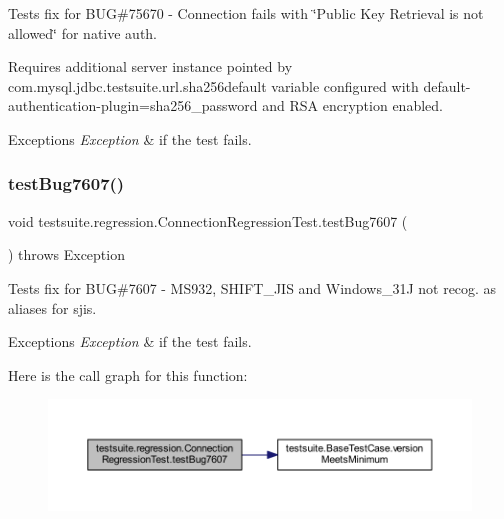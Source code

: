Tests fix for B\+UG\#75670 -\/ Connection fails with \char`\"{}\+Public Key Retrieval is not allowed\char`\"{} for native auth.

Requires additional server instance pointed by com.\+mysql.\+jdbc.\+testsuite.\+url.\+sha256default variable configured with default-\/authentication-\/plugin=sha256\+\_\+password and R\+SA encryption enabled.


\begin{DoxyExceptions}{Exceptions}
{\em Exception} & if the test fails. \\
\hline
\end{DoxyExceptions}
\mbox{\label{classtestsuite_1_1regression_1_1_connection_regression_test_a546e675781e810a5d2ba2f12d41a3f24}} 
\subsubsection{\texorpdfstring{test\+Bug7607()}{testBug7607()}}
{\footnotesize\ttfamily void testsuite.\+regression.\+Connection\+Regression\+Test.\+test\+Bug7607 (\begin{DoxyParamCaption}{ }\end{DoxyParamCaption}) throws Exception}

Tests fix for B\+UG\#7607 -\/ M\+S932, S\+H\+I\+F\+T\+\_\+\+J\+IS and Windows\+\_\+31J not recog. as aliases for sjis.


\begin{DoxyExceptions}{Exceptions}
{\em Exception} & if the test fails. \\
\hline
\end{DoxyExceptions}
Here is the call graph for this function\+:
\nopagebreak
\begin{figure}[H]
\begin{center}
\leavevmode
\includegraphics[width=350pt]{classtestsuite_1_1regression_1_1_connection_regression_test_a546e675781e810a5d2ba2f12d41a3f24_cgraph}
\end{center}
\end{figure}
\mbox{\label{classtestsuite_1_1regression_1_1_connection_regression_test_adca05ee2426734f0d6b5bdf2c98ceeef}} 
